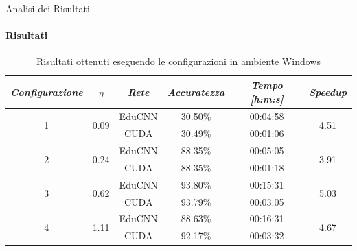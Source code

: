 \documentclass[
 ]{beamer}
\begin{document}
\begin{frame}{Analisi dei Risultati}
    \framesubtitle{Risultati}

        \begin{table}
            \centering
            \renewcommand\arraystretch{1.3}
            \small
            \begin{tabular}{| c | c | c | c | c | c |}
                \hline
                \emph{Configurazione} & $\eta$ & \emph{Rete} & \emph{Accuratezza} & \emph{Tempo [h:m:s]} & \emph{Speedup} \\
                \hline
                \multirow{2}{*}{1} & \multirow{2}{*}{0.09} & EduCNN & 30.50\% & 00:04:58 & \multirow{2}{*}{4.51} \\ \cline{3-5} 
                                   &                       & CUDA   & 30.49\% & 00:01:06  & \\
                \hline
                \multirow{2}{*}{2} & \multirow{2}{*}{0.24} & EduCNN & 88.35\% & 00:05:05 & \multirow{2}{*}{3.91} \\ \cline{3-5} 
                                   &                       & CUDA   & 88.35\% & 00:01:18  & \\
                \hline
                \multirow{2}{*}{3} & \multirow{2}{*}{0.62} & EduCNN & 93.80\% & 00:15:31 & \multirow{2}{*}{5.03} \\ \cline{3-5} 
                                   &                       & CUDA   & 93.79\% & 00:03:05  & \\
                \hline
                \multirow{2}{*}{4} & \multirow{2}{*}{1.11} & EduCNN & 88.63\% & 00:16:31 & \multirow{2}{*}{4.67} \\ \cline{3-5} 
                                   &                       & CUDA   & 92.17\% & 00:03:32  & \\
                \hline
            \end{tabular}
            \caption{Risultati ottenuti eseguendo le configurazioni in ambiente Windows}          
        \end{table}    
\end{frame}





\end{document}

